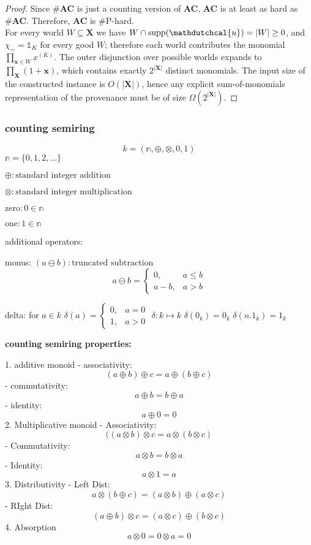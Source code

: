 \documentclass[10pt,a4paper]{scrartcl}
\theoremstyle{definition}
\theoremstyle{remark}
\begin{document}
\begin{proof}
  Since \#\textbf{AC} is just a counting version of \textbf{AC}, \textbf{AC} is at least as hard as \#\textbf{AC}. Therefore, \textbf{AC} is \#P-hard. \\
  For every world \(W\subseteq\mathbf{X}\) we have
  \(W\cap\mathrm{supp}(\mathdutchcal{u})=|W|\ge0\), and
  \(\chi_= = \mathbb{1}_K\) for every good \(W\); therefore each world contributes the monomial
  \(\prod_{\textbf{x}\in W} x^{(K)}\). The outer disjunction over possible worlds expands to \(\prod_\mathbf{X}(1+\mathbf{x})\), which
  contains exactly \(2^{|\mathbf{X}|}\) distinct monomials. The input size
  of the constructed instance is \(O(|\mathbf{X}|)\),
  hence any explicit sum-of-monomials representation of the provenance must be of size
  \(\Omega(2^{|\mathbf{X}|})\).

\end{proof}
\subsubsection{counting semiring}
$$k = (\mathbb{n}, \oplus, \otimes, 0, 1)$$
$\mathbb{n} = \{0,1,2,\dots\}$

$\oplus : \text{standard integer addition}$

$\otimes : \text{standard integer multiplication}$

$\text{zero} : 0 \in \mathbb{n}$

$\text{one} : 1 \in \mathbb{n}$

additional operators:

monus: $(a \ominus b): \text{truncated subtraction}$
$$ a \ominus b = \begin{cases} 0, &  a\leq b\\ a-b,& a>b \end{cases}$$

delta: 
for $a \in k$
$\delta(a) = \begin{cases} 0, & a=0\\ 1, & a>0 \end{cases}$
$\delta:k \mapsto k $
$\delta(0_k)=0_k$
$\delta(n.1_k)=1_k$


\textbf{counting semiring properties:}

1. additive monoid
- associativity: $$(a \oplus b) \oplus c = a \oplus (b\oplus c)$$
- commutativity: $$a \oplus b = b \oplus a$$
- identity: $$a \oplus 0 = 0$$
2. Multiplicative monoid
- Associativity: $$( (a \otimes b) \otimes c = a \otimes (b\otimes c)$$
- Commutativity: $$a \otimes b = b \otimes a$$
- Identity: $$a \otimes 1 = a$$
3. Distributivity
- Left Dist: $$a \otimes (b \oplus c)= (a \otimes b)\oplus(a \otimes c)$$
- RIght Dist: $$(a \oplus b)\otimes c=(a \otimes c)\oplus(b \otimes c)$$
 4. Absorption
$$a \otimes 0 = 0 \otimes a = 0$$
\end{document}
